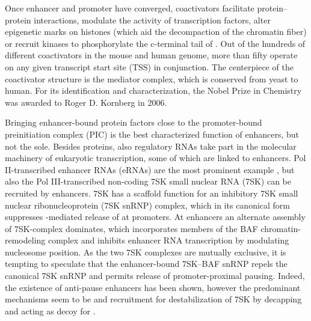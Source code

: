Once enhancer and promoter have converged, coactivators facilitate protein–protein interactions\cite{Kaiser1996}, modulate the activity of transcription factors, alter epigenetic marks on histones (which aid the decompaction of the chromatin fiber)\cite{Ogryzko1996,Spencer1997} or recruit kinases to phosphorylate the c-terminal tail of \cite{Hirose2007}. Out of the hundreds of different coactivators in the mouse and human genome, more than fifty operate on any given transcript start site (TSS) in conjunction. The centerpiece of the coactivator structure is the mediator complex\cite{Mittler2001}, which is conserved from yeast to human\cite{Kornberg2005,Robinson2016}. For its identification and characterization, the Nobel Prize in Chemistry was awarded to Roger D. Kornberg in 2006.

Bringing enhancer-bound protein factors close to the promoter-bound preinitiation complex (PIC) is the best characterized function of enhancers, but not the sole. Besides proteins, also regulatory RNAs take part in the molecular machinery of eukaryotic transcription, some of which are linked to enhancers. Pol II-transcribed enhancer RNAs (eRNAs) are the most prominent example , but also the Pol III-transcribed non-coding 7SK small nuclear RNA (7SK) can be recruited by enhancers\cite{CQuaresma2016}. 7SK has a scaffold function for an inhibitory 7SK small nuclear ribonucleoprotein (7SK snRNP) complex, which in its canonical form suppresses -mediated release of  at promoters\cite{Core2008,Jonkers2014}. At enhancers an alternate assembly of 7SK-complex dominates, which incorporates members of the BAF chromatin-remodeling complex and inhibits enhancer RNA transcription by modulating nucleosome position\cite{Flynn2016}. As the two 7SK complexes are mutually exclusive\cite{CQuaresma2016}, it is tempting to speculate that the enhancer-bound 7SK–BAF snRNP repels the canonical 7SK snRNP and permits release of promoter-proximal pausing. Indeed, the existence of anti-pause enhancers has been shown\cite{Liu2013}, however the predominant mechanisms seem to be  and  recruitment for destabilization of 7SK by decapping\cite{Ong2011,Liu2013} and acting as decoy for \cite{Schaukowitch2014}.

